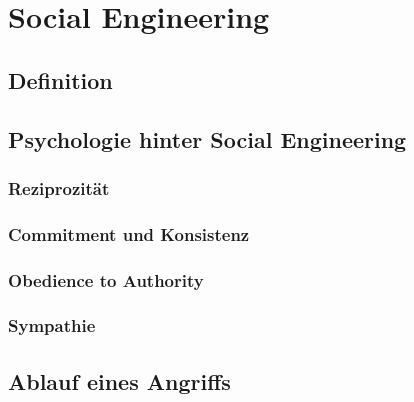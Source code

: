 \chapter{Social Engineering}\label{ch:SocialEngineering}

\section{Definition}

\section{Psychologie hinter Social Engineering}
\subsection{Reziprozität}
\subsection{Commitment und Konsistenz}
\subsection{Obedience to Authority}
\subsection{Sympathie}

\section{Ablauf eines Angriffs}